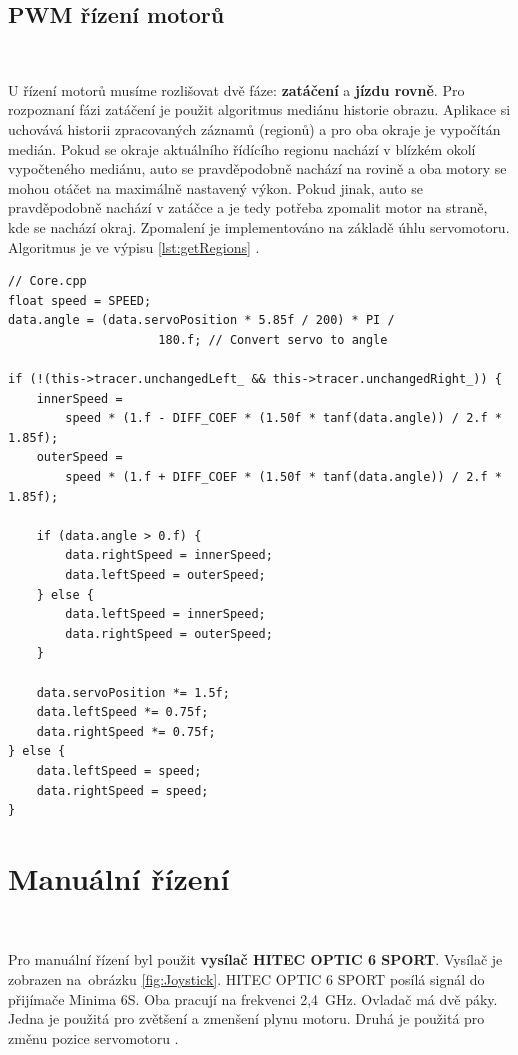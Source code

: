 \subsection{PWM řízení motorů}\

U řízení motorů musíme rozlišovat dvě fáze: \textbf{zatáčení} a \textbf{jízdu
rovně}. Pro rozpoznaní fázi zatáčení je použit algoritmus mediánu historie obrazu.
Aplikace si uchovává historii zpracovaných záznamů (regionů) a pro oba okraje je
vypočítán medián. Pokud se okraje aktuálního řídícího regionu nachází v blízkém
okolí vypočteného mediánu, auto se pravděpodobně nachází na rovině a oba motory se
mohou otáčet na maximálně nastavený výkon. Pokud jinak, auto se pravděpodobně
nachází v zatáčce a je tedy potřeba zpomalit motor na straně, kde se nachází okraj.
Zpomalení je implementováno na základě úhlu servomotoru. Algoritmus je ve výpisu \ref{lst:getRegions} \cite{robot}.
\begin{lstlisting}[caption = Algoritmus kontroly PWM motorů\cite{robot}, label = lst:controlPWM]
// Core.cpp
float speed = SPEED;
data.angle = (data.servoPosition * 5.85f / 200) * PI /
	                 180.f; // Convert servo to angle

if (!(this->tracer.unchangedLeft_ && this->tracer.unchangedRight_)) {
    innerSpeed =
        speed * (1.f - DIFF_COEF * (1.50f * tanf(data.angle)) / 2.f * 1.85f);
    outerSpeed =
        speed * (1.f + DIFF_COEF * (1.50f * tanf(data.angle)) / 2.f * 1.85f);

    if (data.angle > 0.f) {
        data.rightSpeed = innerSpeed;
        data.leftSpeed = outerSpeed;
    } else {
        data.leftSpeed = innerSpeed;
        data.rightSpeed = outerSpeed;
    }

    data.servoPosition *= 1.5f;
    data.leftSpeed *= 0.75f;
    data.rightSpeed *= 0.75f;
} else {
    data.leftSpeed = speed;
    data.rightSpeed = speed;
}
\end{lstlisting}

\section{Manuální řízení}\

Pro manuální řízení byl použit \textbf{vysílač HITEC OPTIC 6 SPORT}.
Vysílač je zobrazen na~obrázku \ref{fig:Joystick}. HITEC OPTIC 6 SPORT posílá signál do přijímače Minima 6S. Oba pracují na
frekvenci 2,4~GHz. Ovladač má dvě páky. Jedna je použitá pro zvětšení a zmenšení
plynu motoru. Druhá je použitá pro změnu pozice servomotoru \cite{RC}.

